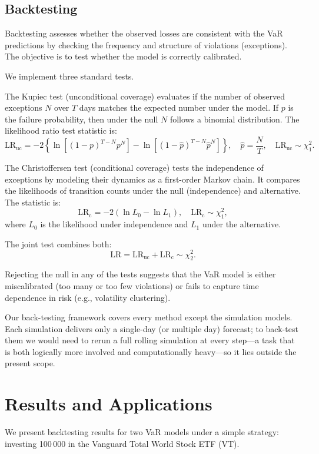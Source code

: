 \documentclass{article}
\begin{document}
\subsection{Backtesting}


Backtesting assesses whether the observed losses are consistent with the VaR predictions by checking the frequency and structure of violations (exceptions). The objective is to test whether the model is correctly calibrated.

We implement three standard tests.

The Kupiec test (unconditional coverage) evaluates if the number of observed exceptions $N$ over $T$ days matches the expected number under the model. If $p$ is the failure probability, then under the null $N$ follows a binomial distribution. The likelihood ratio test statistic is:
\[
\text{LR}_{\text{uc}} = -2 \left\{ \ln\left[(1 - p)^{T - N} p^N \right] - \ln\left[(1 - \hat{p})^{T - N} \hat{p}^N \right] \right\}, \quad \hat{p} = \frac{N}{T}, \quad \text{LR}_{\text{uc}} \sim \chi^2_1.
\]

The Christoffersen test (conditional coverage) tests the independence of exceptions by modeling their dynamics as a first-order Markov chain. It compares the likelihoods of transition counts under the null (independence) and alternative. The statistic is:
\[
\text{LR}_{\text{c}} = -2 (\ln L_0 - \ln L_1), \quad \text{LR}_{\text{c}} \sim \chi^2_1,
\]
where $L_0$ is the likelihood under independence and $L_1$ under the alternative.

The joint test combines both:
\[
\text{LR} = \text{LR}_{\text{uc}} + \text{LR}_{\text{c}} \sim \chi^2_2.
\]

Rejecting the null in any of the tests suggests that the VaR model is either miscalibrated (too many or too few violations) or fails to capture time dependence in risk (e.g., volatility clustering).

Our back-testing framework covers every method except the simulation models. Each simulation delivers only a single-day (or multiple day) forecast; to back-test them we would need to rerun a full rolling simulation at every step—a task that is both logically more involved and computationally heavy—so it lies outside the present scope.


\section{Results and Applications}

We present backtesting results for two VaR models under a simple strategy: investing 100\,000 in the Vanguard Total World Stock ETF (VT).
\end{document}
